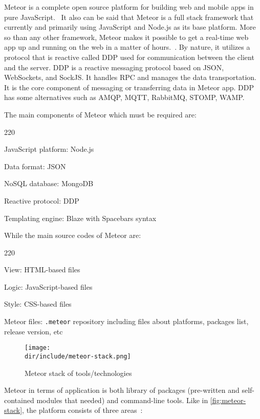 Meteor is a complete open source platform for building web and mobile apps in pure JavaScript.~\autocite{Meteor2015}
It also can be said that Meteor is a full stack framework that currently and primarily using JavaScript and Node.js as its base platform.
More so than any other framework, Meteor makes it possible to get a real-time web app up and running on the web in a matter of hours.~\autocite{Coleman2014Meteor}.
By nature, it utilizes a protocol that is reactive called \ac{DDP} used for communication between the client and the server.
\ac{DDP} is a reactive messaging protocol based on \ac{JSON}, WebSockets, and SockJS.
It handles \ac{RPC} and manages the data transportation.
It is the core component of messaging or transferring data in Meteor app.
\ac{DDP} has some alternatives such as \ac{AMQP}, \ac{MQTT}, RabbitMQ, \ac{STOMP}, \ac{WAMP}.

The main components of Meteor which must be required are:

\begin{dinglist}{220}
\item JavaScript platform: Node.js
\item Data format: \ac{JSON}
\item NoSQL database: MongoDB
\item Reactive protocol: \ac{DDP}
\item Templating engine: Blaze with Spacebars syntax
\end{dinglist}

While the main source codes of Meteor are:

\begin{dinglist}{220}
\item View: \ac{HTML}-based files
\item Logic: JavaScript-based files
\item Style: \ac{CSS}-based files
\item Meteor files: \verb|.meteor| repository including files about platforms, packages list, release version, etc
\end{dinglist}

\begin{figure}[htbp]
  \centering
  \texttt{[image: \\dir/include/meteor-stack.png]}
  \caption[Meteor Stack]{Meteor stack of tools/technologies}
  \label{fig:meteor-stack}
\end{figure}

Meteor in terms of application is both library of packages (pre-written and self-contained modules that needed) and command-line tools.
Like in \autoref{fig:meteor-stack}, the platform consists of three areas~\autocite{Hochhaus2014Meteor}:

